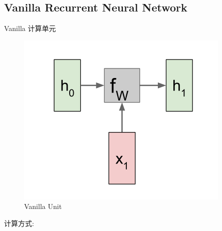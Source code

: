 \documentclass{article}
\begin{document}
\subsection{Vanilla Recurrent Neural Network}
Vanilla 计算单元
\begin{figure}[H]
	\centering
	\includegraphics[scale=0.5]{vanilla_unit.png}
	\caption{Vanilla Unit}
	\label{fig:1}
\end{figure}
计算方式:
\end{document}
